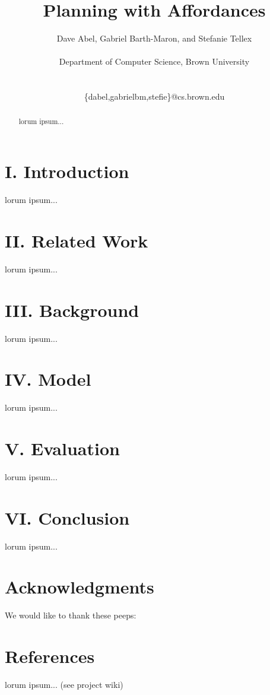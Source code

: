\documentclass[a4paper]{article}
\title{Planning with Affordances}
\author{Dave Abel, Gabriel Barth-Maron, and Stefanie Tellex \\ \\ Department of Computer Science, Brown University \\ \\ \begin{courier}\{dabel,gabrielbm,stefie\}@cs.brown.edu\end{courier}}
\date{}
\begin{document}
\maketitle

\begin{abstract}
lorum ipsum...
\end{abstract}

\section{I. Introduction}

lorum ipsum...

\section{II. Related Work}

lorum ipsum...

\section{III. Background}

lorum ipsum...

\section{IV. Model}

lorum ipsum...

\section{V. Evaluation}

lorum ipsum...

\section{VI. Conclusion}
lorum ipsum...

\section{Acknowledgments}
We would like to thank these peeps:
\section{References}
lorum ipsum... (see project wiki)
\end{document}
